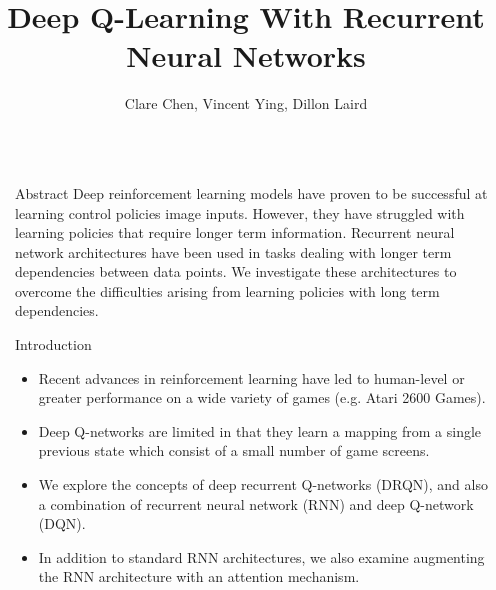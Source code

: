 \documentclass[final]{beamer}
\title{Deep Q-Learning With Recurrent Neural Networks} %
\author{Clare Chen, Vincent Ying, Dillon Laird} %
\institute{Stanford, 2016} %
\newlength{\sepwid}
\newlength{\onecolwid}
\begin{document}

\setlength{\belowcaptionskip}{2ex} %
\setlength\belowdisplayshortskip{2ex} %

\begin{frame}[t] %

\begin{columns}[t] %

\begin{column}{\sepwid}\end{column} %

\begin{column}{\onecolwid} %


\begin{alertblock}{Abstract}
    Deep reinforcement learning models have proven to be successful at learning
    control policies image inputs. However, they have struggled with learning
    policies that require longer term information. Recurrent neural network
    architectures have been used in tasks dealing with longer term dependencies
    between data points. We investigate these architectures to overcome the
    difficulties arising from learning policies with long term dependencies.
\end{alertblock}


\begin{block}{Introduction}
    \begin{itemize}
        \item Recent advances in reinforcement learning have led to human-level
              or greater performance on a wide variety of games (e.g. Atari 2600
              Games). 
        \item Deep Q-networks are limited in that they learn a mapping from a single
              previous state which consist of a small number of game screens.
        \item We explore the concepts of deep recurrent Q-networks (DRQN),
              and also a combination of recurrent neural network (RNN) and deep
              Q-network (DQN).
        \item In addition to standard RNN architectures, we also examine augmenting the RNN
              architecture with an attention mechanism. 
    \end{itemize}
\end{block}


\end{column}
\end{columns}
\end{frame}
\end{document}
